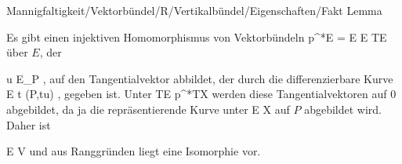 {Mannigfaltigkeit/Vektorbündel/R/Vertikalbündel/Eigenschaften/Fakt}
{Lemma}
{}
{

\faktzusatz {}
\faktzusatz {}

}
{

 {Es gibt einen injektiven Homomorphismus von Vektorbündeln
\maabbdisp {} {p^*E = E \oplus E} { TE
} {}
über $E$, der

\mavergleichskette
{\vergleichskette
{ u
}
{ \in }{ E_P
}
{  }{
}
{    }{
}
{   }{
}
}
{}{}{,}
auf den Tangentialvektor abbildet, der durch die
 {} {}
differenzierbare Kurve
\maabbeledisp {} {\R} {E
} { t } {(P,tu)
} {,}
gegeben ist. Unter
\maabbdisp {} {TE} { p^*TX
} {}
werden diese Tangentialvektoren auf $0$ abgebildet, da ja die repräsentierende Kurve unter
 { E } { X
} {}
auf $P$ abgebildet wird. Daher ist

\mavergleichskette
{\vergleichskette
{ E
}
{ \subseteq }{ V
}
{  }{
}
{    }{
}
{   }{
}
}
{}{}{}
und aus Ranggründen liegt eine Isomorphie vor.
}

}

